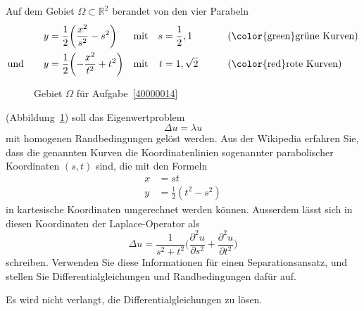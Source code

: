 Auf dem Gebiet $\Omega\subset\mathbb R^2$ berandet von den vier Parabeln
\[
\begin{aligned}
y&=\frac12\biggl( \frac{x^2}{s^2}-s^2\biggr)&&\text{mit}&s&=\frac12,1
	&&\qquad\text{({\color{green}grüne} Kurven)}\\
\text{und}\qquad
y&=\frac12\biggl(-\frac{x^2}{t^2}+t^2\biggr)&&\text{mit}&t&=1,\sqrt{2}
	&&\qquad\text{({\color{red}rote} Kurven)}
\end{aligned}
\]
\begin{figure}
\centering
{}
\caption{Gebiet $\Omega$ für Aufgabe~\ref{40000014}
\label{40000014:domain}}
\end{figure}%
(Abbildung~\ref{40000014:domain})
soll das Eigenwertproblem
\begin{equation}
\Delta u = \lambda u
\label{40000014:dgl}
\end{equation}
mit homogenen Randbedingungen gelöst werden.
Aus der Wikipedia erfahren Sie, dass die genannten Kurven 
die Koordinatenlinien sogenannter parabolischer Koordinaten $(s,t)$ sind,
die mit den Formeln
\begin{align*}
x&=st\\
y&=\frac12(t^2-s^2)
\end{align*}
in kartesische Koordinaten umgerechnet werden können.
Ausserdem lässt sich in diesen Koordinaten der Laplace-Operator als
\[
\Delta u = \frac1{s^2 + t^2}\biggl(\frac{\partial^2 u}{\partial s^2}+\frac{\partial^2u}{\partial t^2}\biggr)
\]
schreiben.
Verwenden Sie diese Informationen für einen Separationsansatz, und
stellen Sie Differentialgleichungen und Randbedingungen dafür auf.

\begin{hinweis}
Es wird nicht verlangt, die Differentialgleichungen zu lösen.
\end{hinweis}

